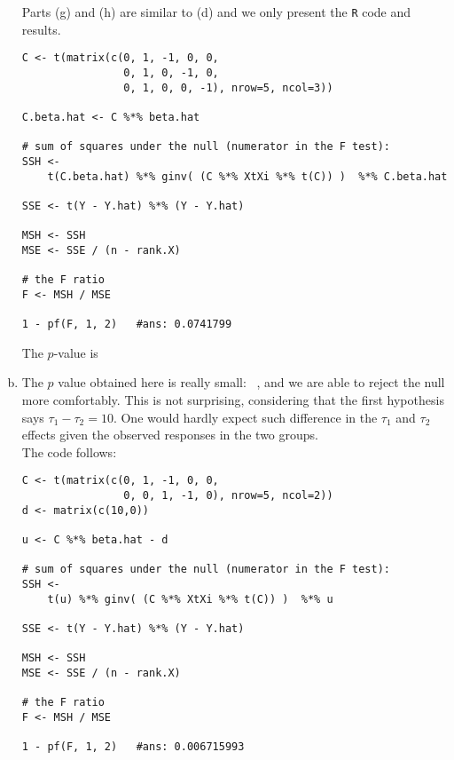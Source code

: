 \documentclass[paper=a4, fontsize=11pt]{scrartcl} %
\begin{document}
\begin{enumerate}[(a)]
Parts (g) and (h) are similar to (d) and we only present the \texttt{R} code and results.
 \begin{lstlisting}[basicstyle=\ttfamily\small\bfseries]
C <- t(matrix(c(0, 1, -1, 0, 0,
                0, 1, 0, -1, 0,
                0, 1, 0, 0, -1), nrow=5, ncol=3))

C.beta.hat <- C %*% beta.hat 

# sum of squares under the null (numerator in the F test):
SSH <- 
    t(C.beta.hat) %*% ginv( (C %*% XtXi %*% t(C)) )  %*% C.beta.hat 

SSE <- t(Y - Y.hat) %*% (Y - Y.hat) 

MSH <- SSH
MSE <- SSE / (n - rank.X) 

# the F ratio
F <- MSH / MSE

1 - pf(F, 1, 2)   #ans: 0.0741799
\end{lstlisting}

The $p$-value is \ \\


\item   The $p$ value obtained here is really small: \ , and we are able to reject the null more comfortably. This is not surprising, considering 
that the first hypothesis says $\tau_1 - \tau_2 = 10$. One would hardly expect such difference in the 
$\tau_1$ and $\tau_2$ effects given the observed responses in the two groups.\\

The code follows:\\
 
 \begin{lstlisting}[basicstyle=\ttfamily\small\bfseries]
C <- t(matrix(c(0, 1, -1, 0, 0,
                0, 0, 1, -1, 0), nrow=5, ncol=2))
d <- matrix(c(10,0))

u <- C %*% beta.hat - d

# sum of squares under the null (numerator in the F test):
SSH <- 
    t(u) %*% ginv( (C %*% XtXi %*% t(C)) )  %*% u 

SSE <- t(Y - Y.hat) %*% (Y - Y.hat) 

MSH <- SSH
MSE <- SSE / (n - rank.X) 

# the F ratio
F <- MSH / MSE

1 - pf(F, 1, 2)   #ans: 0.006715993
\end{lstlisting}

\end{enumerate}

\bigskip
\bigskip
\end{document}
